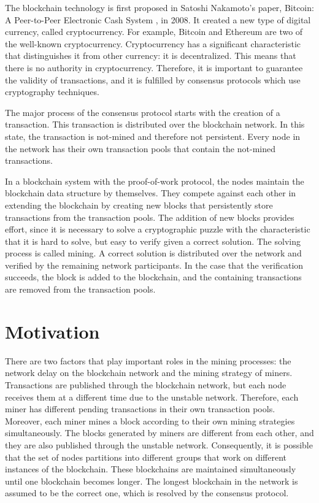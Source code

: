 The blockchain technology is first proposed in Satoshi Nakamoto’s paper, Bitcoin: A Peer-to-Peer Electronic Cash System \cite{Nakamoto2008}, in 2008. It created a new type of digital currency, called cryptocurrency. For example, Bitcoin \cite{bitcoin} and Ethereum \cite{ethereum} are two of the well-known cryptocurrency. Cryptocurrency has a significant characteristic that distinguishes it from other currency: it is decentralized. This means that there is no authority in cryptocurrency. Therefore, it is important to guarantee the validity of transactions, and it is fulfilled by consensus protocols which use cryptography techniques. \cite{Narayanan2016}

The major process of the consensus protocol starts with the creation of a transaction. This transaction is distributed over the blockchain network. In this state, the transaction is not-mined and therefore not persistent. Every node in the network has their own transaction pools that contain the not-mined transactions.

In a blockchain system with the proof-of-work protocol, the nodes maintain the blockchain data structure by themselves. They compete against each other in extending the blockchain by creating new blocks that persistently store transactions from the transaction pools. The addition of new blocks provides effort, since it is necessary to solve a cryptographic puzzle with the characteristic that it is hard to solve, but easy to verify given a correct solution. The solving process is called mining. A correct solution is distributed over the network and verified by the remaining network participants. In the case that the verification succeeds, the block is added to the blockchain, and the containing transactions are removed from the transaction pools.

\section{Motivation}

There are two factors that play important roles in the mining processes: the network delay on the blockchain network and the mining strategy of miners. Transactions are published through the blockchain network, but each node receives them at a different time due to the unstable network. Therefore, each miner has different pending transactions in their own transaction pools. Moreover, each miner mines a block according to their own mining strategies simultaneously. The blocks generated by miners are different from each other, and they are also published through the unstable network. Consequently, it is possible that the set of nodes partitions into different groups that work on different instances of the blockchain. These blockchains are maintained simultaneously until one blockchain becomes longer. The longest blockchain in the network is assumed to be the correct one, which is resolved by the consensus protocol.

